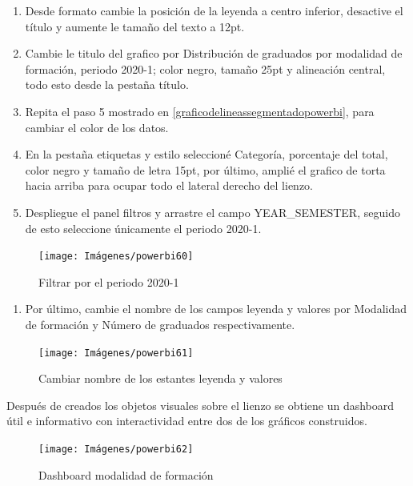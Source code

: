 \documentclass[
]{book}
\providecommand{\tightlist}{%
  \setlength{\itemsep}{0pt}\setlength{\parskip}{0pt}}
\begin{document}
\begin{enumerate}
\def\labelenumi{\arabic{enumi}.}
\setcounter{enumi}{2}
\item
  Desde formato cambie la posición de la leyenda a centro inferior, desactive el título y aumente le tamaño del texto a 12pt.
\item
  Cambie le titulo del grafico por Distribución de graduados por modalidad de formación, periodo 2020-1; color negro, tamaño 25pt y alineación central, todo esto desde la pestaña título.
\item
  Repita el paso 5 mostrado en \ref{graficodelineassegmentadopowerbi}, para cambiar el color de los datos.
\item
  En la pestaña etiquetas y estilo seleccioné Categoría, porcentaje del total, color negro y tamaño de letra 15pt, por último, amplié el grafico de torta hacia arriba para ocupar todo el lateral derecho del lienzo.
\item
  Despliegue el panel filtros y arrastre el campo YEAR\_SEMESTER, seguido de esto seleccione únicamente el periodo 2020-1.
\end{enumerate}

\begin{figure}

{\centering \texttt{[image: Imágenes/powerbi60]} 

}

\caption{Filtrar por el periodo 2020-1}\label{fig:paso7circular-fig}
\end{figure}

\begin{enumerate}
\def\labelenumi{\arabic{enumi}.}
\setcounter{enumi}{7}
\tightlist
\item
  Por último, cambie el nombre de los campos leyenda y valores por Modalidad de formación y Número de graduados respectivamente.
\end{enumerate}

\begin{figure}

{\centering \texttt{[image: Imágenes/powerbi61]} 

}

\caption{Cambiar nombre de los estantes leyenda y valores}\label{fig:paso8circular-fig}
\end{figure}

Después de creados los objetos visuales sobre el lienzo se obtiene un dashboard útil e informativo con interactividad entre dos de los gráficos construidos.

\begin{figure}

{\centering \texttt{[image: Imágenes/powerbi62]} 

}

\caption{Dashboard modalidad de formación}\label{fig:dashboardmodalidadformacion-fig}
\end{figure}
\end{document}
